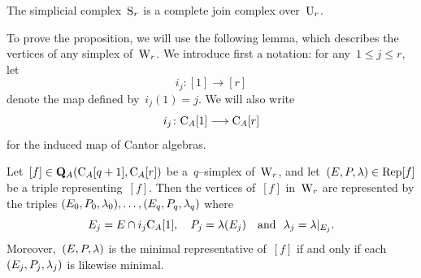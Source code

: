 \begin{prop}\label{join} 
The simplicial complex~$\mathrm{S}_r$ is a  complete join complex over~$\mathrm{U}_r$. 
\end{prop}

To prove the proposition, we will use the following lemma, which describes the vertices of any simplex of~$\mathrm{W}_r$. We introduce first a notation: for any~$1\le j\le r$, let 
$$i_j\colon[1]\to [r]$$
denote the map defined by~$i_j(1)=j$. We will also write 
$$i_j\colon\mathrm{C}_A[1]\longrightarrow \mathrm{C}_A[r]$$
for the induced map of Cantor algebras. 

\begin{lem}
Let~$[f]\in \mathbf{Q}_A(\mathrm{C}_A[q+1],\mathrm{C}_A[r])$ be a~$q$--simplex of~$\mathrm{W}_r$, and let~$(E,P,\lambda)\in \operatorname{Rep}[f]$ be a triple representing~$[f]$. Then the vertices of~$[f]$ in~$\mathrm{W}_r$ are represented by the triples 
$(E_0,P_0,\lambda_0),\dots,(E_q,P_q,\lambda_q)$ where $$E_j=E\cap i_j\mathrm{C}_A[1], \ \ \ P_j=\lambda(E_j) \ \ \ \textrm{and} \ \ \lambda_j=\lambda|_{E_j}.$$ Moreover,~$(E,P,\lambda)$ is the  minimal representative of~$[f]$ if and only if 
each~$(E_j,P_j,\lambda_j)$ is likewise minimal.
\end{lem}


